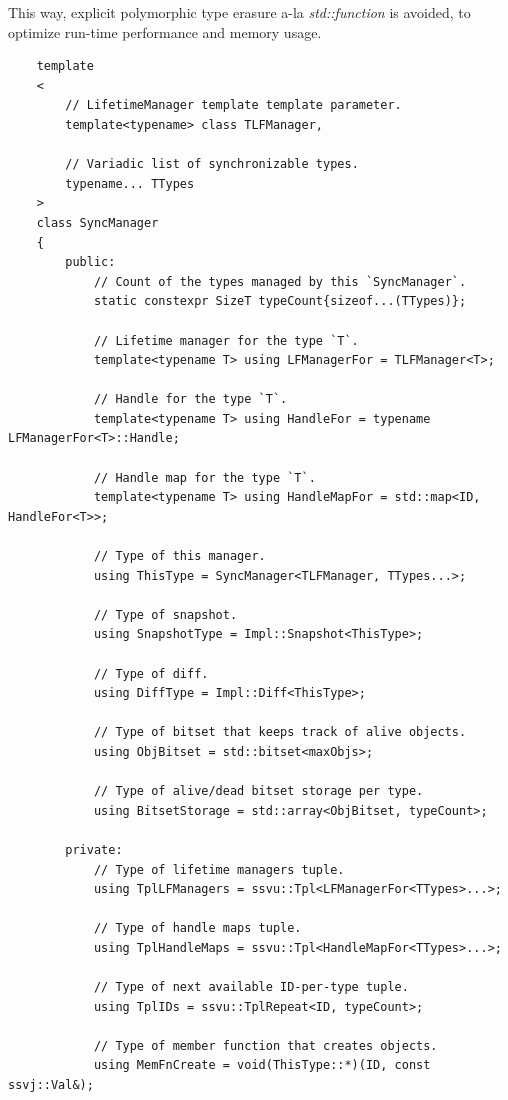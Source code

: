 \documentclass{report}
\begin{document}
                This way, explicit polymorphic type erasure a-la \emph{std::function} is avoided, to optimize run-time performance and memory usage.

\begin{verbatim}    
    template
    <
        // LifetimeManager template template parameter.
        template<typename> class TLFManager, 

        // Variadic list of synchronizable types.
        typename... TTypes
    > 
    class SyncManager
    {
        public:
            // Count of the types managed by this `SyncManager`.
            static constexpr SizeT typeCount{sizeof...(TTypes)};

            // Lifetime manager for the type `T`.
            template<typename T> using LFManagerFor = TLFManager<T>;

            // Handle for the type `T`.
            template<typename T> using HandleFor = typename LFManagerFor<T>::Handle;

            // Handle map for the type `T`.
            template<typename T> using HandleMapFor = std::map<ID, HandleFor<T>>;

            // Type of this manager.
            using ThisType = SyncManager<TLFManager, TTypes...>;

            // Type of snapshot.
            using SnapshotType = Impl::Snapshot<ThisType>;

            // Type of diff.
            using DiffType = Impl::Diff<ThisType>;

            // Type of bitset that keeps track of alive objects.
            using ObjBitset = std::bitset<maxObjs>;

            // Type of alive/dead bitset storage per type.
            using BitsetStorage = std::array<ObjBitset, typeCount>;

        private:
            // Type of lifetime managers tuple.
            using TplLFManagers = ssvu::Tpl<LFManagerFor<TTypes>...>;

            // Type of handle maps tuple.
            using TplHandleMaps = ssvu::Tpl<HandleMapFor<TTypes>...>;

            // Type of next available ID-per-type tuple.
            using TplIDs = ssvu::TplRepeat<ID, typeCount>;

            // Type of member function that creates objects.
            using MemFnCreate = void(ThisType::*)(ID, const ssvj::Val&);


\end{verbatim}
\end{document}
